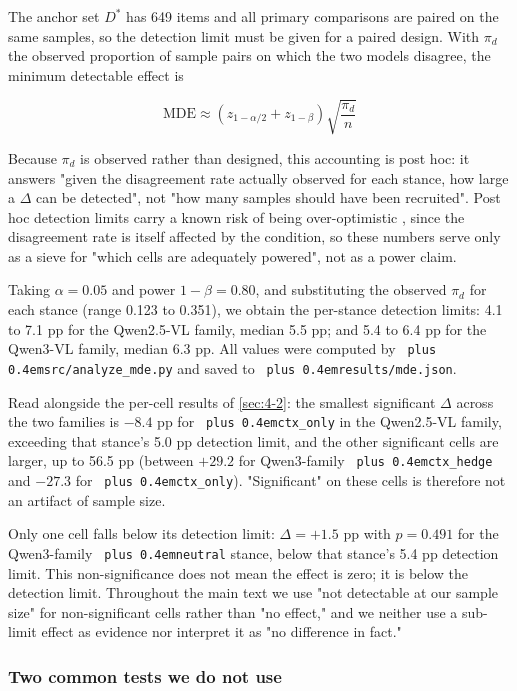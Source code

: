 \documentclass[pdflatex,sn-basic,Numbered]{sn-jnl}
\theoremstyle{thmstyleone}
\theoremstyle{thmstyletwo}
\theoremstyle{thmstylethree}
\DeclareRobustCommand{\code}[1]{\texttt{\spaceskip=0pt plus 0.4em\relax#1}}
\begin{document}
The anchor set $D^*$ has 649 items and all primary comparisons are paired on the same samples,
so the detection limit must be given for a paired design. With $\pi_d$ the observed proportion
of sample pairs on which the two models disagree, the minimum detectable effect is

\begin{equation}
  \text{MDE} \approx (z_{1-\alpha/2} + z_{1-\beta})\sqrt{\frac{\pi_d}{n}}
\end{equation}

Because $\pi_d$ is observed rather than designed, this accounting is post hoc: it answers "given
the disagreement rate actually observed for each stance, how large a $\Delta$ can be detected",
not "how many samples should have been recruited". Post hoc detection limits carry a known risk
of being over-optimistic \cite{ref30}, since the disagreement rate is itself affected by the condition,
so these numbers serve only as a sieve for "which cells are adequately powered", not as a power
claim.

Taking $\alpha = 0.05$ and power $1-\beta = 0.80$, and substituting the observed $\pi_d$ for each stance
(range 0.123 to 0.351), we obtain the per-stance detection limits: 4.1 to 7.1 pp for the Qwen2.5-VL family, median 5.5 pp; and 5.4 to 6.4 pp for the Qwen3-VL family, median 6.3 pp.
All values were computed by \code{src/analyze\_mde.py} and saved to \code{results/mde.json}.

Read alongside the per-cell results of \ref{sec:4-2}: the smallest significant $\Delta$ across the two
families is $-8.4$ pp for \code{ctx\_only} in the Qwen2.5-VL family, exceeding that stance's 5.0 pp
detection limit, and the other significant cells are larger, up to 56.5 pp (between $+29.2$ for
Qwen3-family \code{ctx\_hedge} and $-27.3$ for \code{ctx\_only}). "Significant" on these cells is therefore
not an artifact of sample size.

Only one cell falls below its detection limit: $\Delta = +1.5$ pp with $p = 0.491$ for the Qwen3-family \code{neutral} stance, below that stance's 5.4 pp detection limit. This non-significance does not mean the effect is zero; it is below the detection limit. Throughout the main text we use "not detectable at our sample size" for non-significant cells rather than "no effect," and we neither use a sub-limit effect as evidence nor interpret it as "no difference in fact."

\subsubsection{Two common tests we do not use}
\label{sec:4-5-5}
\end{document}
